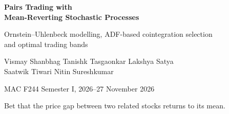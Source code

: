 \begin{frame}[plain]
\centering\vspace{10pt}
{\color{deckInk}\LARGE\bfseries Pairs Trading with\\Mean-Reverting Stochastic Processes\par}
\vspace{4pt}
{\color{deckInk!75}\normalsize Ornstein--Uhlenbeck modelling, ADF-based cointegration selection\\and optimal trading bands\par}
\vspace{6pt}
{\small\color{deckInk}Vismay Shanbhag \quad Tanishk Tasgaonkar \quad Lakshya Satya\\
Saatwik Tiwari \quad Nitin Sureshkumar\par}
\vspace{2pt}
{\footnotesize\color{deckMuted}MAC F244 \quad\textbullet\quad Semester I, 2026--27 \quad\textbullet{} November 2026\par}
\vspace{12pt}
{\large\color{deckInk}Bet that the price gap between two related stocks returns to its mean.\par}
\vspace{10pt}
\begin{columns}[T,onlytextwidth]
\end{columns}
\end{frame}
